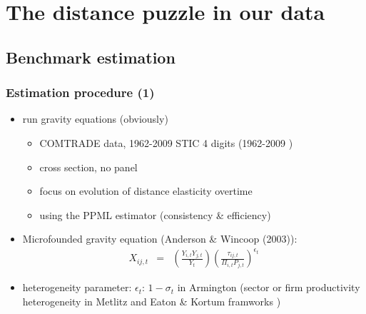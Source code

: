 \documentclass{beamer}
\begin{document}
\section{The distance puzzle in our data}
\subsection{Benchmark estimation}
\begin{frame}\frametitle{Estimation procedure (1)}
\begin{itemize}
	\item run gravity equations (obviously)
	\begin{itemize}
		\item COMTRADE data, 1962-2009 STIC 4 digits (1962-2009 )
		\item cross section, no panel
		\item focus on evolution of distance elasticity overtime
		\item using the PPML estimator (consistency \& efficiency)
	\end{itemize}
\item Microfounded gravity equation (Anderson \& Wincoop (2003)):
\begin{eqnarray}
X_{ij,t} & = & \left(\frac{Y_{i,t}Y_{j,t}}{Y_t}\right)\left(\frac{\tau_{ij,t}}{\Pi_{i,t}P_{j,t}}\right)^{\epsilon_t} \nonumber
\end{eqnarray}
\item heterogeneity parameter: $\epsilon_t$: $1-\sigma_{t}$ in Armington (sector or firm productivity heterogeneity in Metlitz and Eaton \& Kortum framworks )
\vspace{.3cm}
\end{itemize}
\end{frame}
\end{document}
